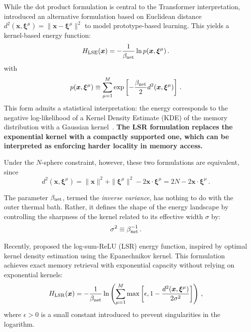\documentclass{article}
\theoremstyle{plain}
\theoremstyle{definition}
\theoremstyle{remark}
\begin{document}
While the dot product formulation is central to the Transformer interpretation, \citet{krotov2021large} introduced an alternative formulation based on Euclidean distance $d^2(\bm{x}, \bm{\xi}^\mu) = \|\bm{x}-\bm{\xi}^\mu\|^2$ to model prototype-based learning. This yields a kernel-based energy function:
\begin{equation}
    H_{\rm LSE}(\bm{x}) = -\frac{1}{\beta_{\rm net}} \ln p(\bm{x}, \bm{\xi}^\mu) \,.
    \label{eq:H_lse}
\end{equation}
with 
\begin{equation}
    p(\bm{x}, \bm{\xi}^\mu) \equiv \sum_{\mu=1}^M \exp\left[ - \frac{\beta_{\rm net}}{2} d^2(\bm{x}, \bm{\xi}^\mu) \right] \,.
    \label{eq:dens}
\end{equation}
This form admits a statistical interpretation: the energy corresponds to the negative log-likelihood of a Kernel Density Estimate (KDE) of the memory distribution with a Gaussian kernel~\cite{hoover2025dense}. 
\textbf{The LSR formulation replaces the exponential kernel with a compactly supported one, which can be interpreted as enforcing harder locality in memory access.}

Under the $N$-sphere constraint, however, these two formulations are  equivalent, since 
\begin{equation}
    d^2(\bm{x}, \bm{\xi}^\mu) = \|\bm{x}\|^2 + \|\bm{\xi}^\mu\|^2 - 2\bm{x} \cdot \bm{\xi}^\mu = 2N - 2\bm{x} \cdot \bm{\xi}^\mu \,.
    \label{eq:edist}
\end{equation}

The parameter $\beta_{\rm net}$, termed the {\it inverse variance}, has nothing to do with the outer thermal bath. Rather, it defines the shape of the energy landscape by controlling the sharpness of the kernel related to its effective width $\sigma$ by:
\begin{equation}
    \sigma^2 \equiv \beta_{\rm net}^{-1} \,.
\end{equation}

Recently, \citet{hoover2025dense} proposed the log-sum-ReLU (LSR) energy function, inspired by optimal kernel density estimation using the Epanechnikov kernel. This formulation achieves exact memory retrieval with exponential capacity without relying on exponential kernels:
\begin{equation}
    H_{\rm LSR}(\bm{x}) = -\frac{1}{\beta_{\rm net}} \ln \left( \sum_{\mu=1}^M \max\left[\epsilon,  1 - \frac{d^2(\bm{x},\bm{\xi}^\mu)}{2\sigma^2} \right] \right) \,,
    \label{eq:H_lsr}
\end{equation}
where $\epsilon > 0$ is a small constant introduced to prevent singularities in the logarithm.
\end{document}
